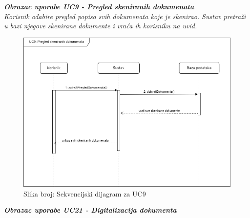 				\textbf{\textit{Obrazac uporabe UC9 - Pregled skeniranih dokumenata}}\\
				
				\textit{Korisnik odabire pregled popisa svih dokumenata koje je skenirao. Sustav pretraži u bazi njegove skenirane dokumente i vraća ih korisniku na uvid.}
				\begin{figure}[H]
					\includegraphics[width=\textwidth]{slike/sekvencijski_dijagram_UC9.PNG} %
					\caption{Slika broj: Sekvencijski dijagram za UC9}
					\label{fig:UC9} %
				\end{figure}
				\clearpage

				\textbf{\textit{Obrazac uporabe UC21 - Digitalizacija dokumenta}}\\
				
